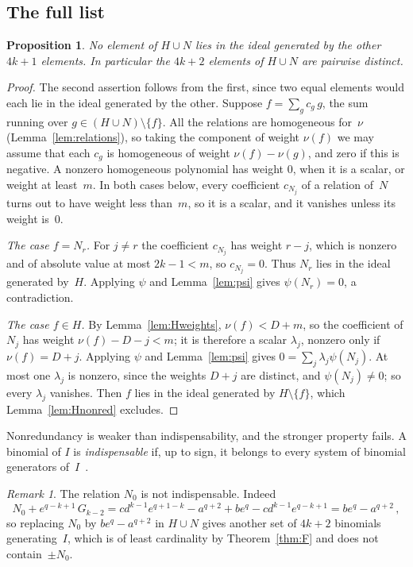 \documentclass[11pt,letterpaper]{article}
\numberwithin{equation}{section}
\theoremstyle{plain}
\newtheorem{proposition}[theorem]{Proposition}
\theoremstyle{remark}
\newtheorem{remark}[theorem]{Remark}
\begin{document}
\subsection{The full list}

\begin{proposition}\label{prop:nonred}
No element of $H\cup N$ lies in the ideal generated by the other $4k+1$ elements. In particular the $4k+2$ elements of $H\cup N$ are pairwise distinct.
\end{proposition}

\begin{proof}
The second assertion follows from the first, since two equal elements would each lie in the ideal generated by the other. Suppose $f=\sum_{g}c_g\,g$, the sum running over $g\in(H\cup N)\setminus\{f\}$. All the relations are homogeneous for~$\nu$ (Lemma~\ref{lem:relations}), so taking the component of weight $\nu(f)$ we may assume that each $c_g$ is homogeneous of weight $\nu(f)-\nu(g)$, and zero if this is negative. A nonzero homogeneous polynomial has weight $0$, when it is a scalar, or weight at least~$m$. In both cases below, every coefficient $c_{N_j}$ of a relation of~$N$ turns out to have weight less than~$m$, so it is a scalar, and it vanishes unless its weight is~$0$.

\emph{The case $f=N_r$.} For $j\ne r$ the coefficient $c_{N_j}$ has weight $r-j$, which is nonzero and of absolute value at most $2k-1<m$, so $c_{N_j}=0$. Thus $N_r$ lies in the ideal generated by~$H$. Applying $\psi$ and Lemma~\ref{lem:psi} gives $\psi(N_r)=0$, a contradiction.

\emph{The case $f\in H$.} By Lemma~\ref{lem:Hweights}, $\nu(f)<D+m$, so the coefficient of $N_j$ has weight $\nu(f)-D-j<m$; it is therefore a scalar $\lambda_j$, nonzero only if $\nu(f)=D+j$. Applying $\psi$ and Lemma~\ref{lem:psi} gives $0=\sum_j\lambda_j\psi(N_j)$. At most one $\lambda_j$ is nonzero, since the weights $D+j$ are distinct, and $\psi(N_j)\neq 0$; so every $\lambda_j$ vanishes. Then $f$ lies in the ideal generated by $H\setminus\{f\}$, which Lemma~\ref{lem:Hnonred} excludes.
\end{proof}

Nonredundancy is weaker than indispensability, and the stronger property fails. A binomial of $I$ is \emph{indispensable} if, up to sign, it belongs to every system of binomial generators of~$I$~\cite{CKT07}.

\begin{remark}\label{rem:N0}
The relation $N_0$ is not indispensable. Indeed
\begin{equation*}
N_0+e^{q-k+1}\,G_{k-2}=cd^{k-1}e^{q+1-k}-a^{q+2}+be^{q}-cd^{k-1}e^{q-k+1}=be^{q}-a^{q+2}\,,
\end{equation*}
so replacing $N_0$ by $be^{q}-a^{q+2}$ in $H\cup N$ gives another set of $4k+2$ binomials generating~$I$, which is of least cardinality by Theorem~\ref{thm:F} and does not contain~$\pm N_0$.
\end{remark}
\end{document}
